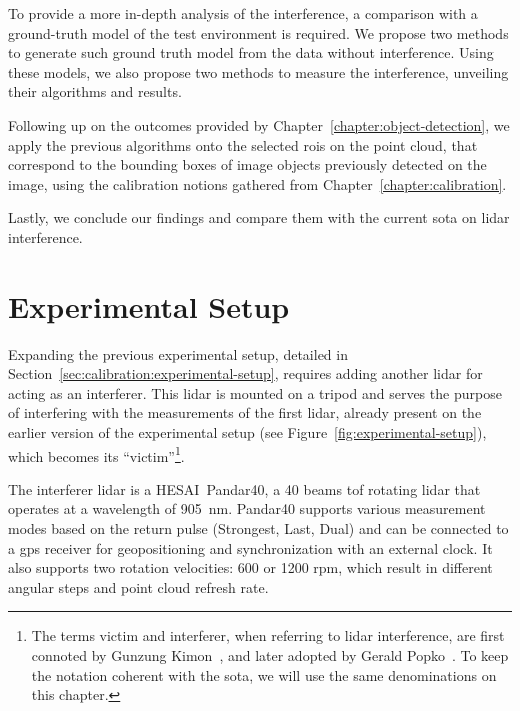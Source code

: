 To provide a more in-depth analysis of the interference, a comparison with a ground-truth model of the test environment is required. We propose two methods to generate such ground truth model from the data without interference. Using these models, we also propose two methods to measure the interference, unveiling their algorithms and results.

Following up on the outcomes provided by Chapter~\ref{chapter:object-detection}, we apply the previous algorithms onto the selected \acp{roi} on the point cloud, that correspond to the bounding boxes of image objects previously detected on the image, using the calibration notions gathered from Chapter~\ref{chapter:calibration}.

Lastly, we conclude our findings and compare them with the current \acl{sota} on \ac{lidar} interference.



\section{Experimental Setup}
\label{sec:lidar-interference:experimental-setup}

Expanding the previous experimental setup, detailed in Section~\ref{sec:calibration:experimental-setup}, requires adding another \ac{lidar} for acting as an interferer. This \ac{lidar} is mounted on a tripod and serves the purpose of interfering with the measurements of the first \ac{lidar}, already present on the earlier version of the experimental setup (see Figure~\ref{fig:experimental-setup}), which becomes its ``victim''\footnote{The terms victim and interferer, when referring to \ac{lidar} interference, are first connoted by Gunzung Kim\etal on~\cite{Kim2015a, Kim2015b, Kim2015c, Kim2017}, and later adopted by Gerald Popko\etal~\cite{Popko2019a, Popko2019b}. To keep the notation coherent with the \acl{sota}, we will use the same denominations on this chapter.}.

The interferer \ac{lidar} is a HESAI\cp~Pandar40\texttrademark, a 40 beams \ac{tof} rotating \ac{lidar} that operates at a wavelength of \SI{905}{\nano\meter}. Pandar40 supports various measurement modes based on the return pulse (Strongest, Last, Dual) and can be connected to a \ac{gps} receiver for geopositioning and synchronization with an external clock. It also supports two rotation velocities: 600 or 1200 \ac{rpm}, which result in different angular steps and point cloud refresh rate. 

